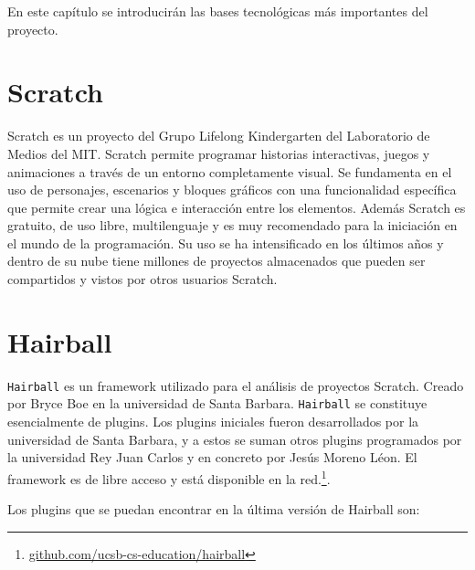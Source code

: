 \documentclass[a4paper, 12pt]{book}
\begin{document}
En este capítulo se introducirán las bases tecnológicas más importantes del proyecto.


\section{Scratch}
\label{sec:seccion2}
Scratch es un proyecto del Grupo Lifelong Kindergarten del Laboratorio de Medios del MIT.
Scratch permite programar historias interactivas, juegos y animaciones a través de un
entorno completamente visual. Se fundamenta en el uso de personajes, escenarios y bloques
gráficos con una funcionalidad específica que permite crear una lógica e interacción
entre los elementos. Además Scratch es gratuito, de uso libre, multilenguaje y es muy
recomendado para la iniciación en el mundo de la programación. Su uso se ha intensificado
en los últimos años y dentro de su nube tiene millones de proyectos almacenados que
pueden ser compartidos y vistos por otros usuarios Scratch.


\section{Hairball}
\label{sec:seccion3}
\texttt{Hairball} es un framework utilizado para el análisis de proyectos Scratch. Creado 
por Bryce Boe en la universidad de Santa Barbara. \texttt{Hairball} se constituye esencialmente de 
plugins. Los plugins iniciales fueron desarrollados por la universidad de Santa Barbara, y
a estos se suman otros plugins programados por la universidad Rey Juan Carlos y en concreto
por Jesús Moreno Léon. El framework es de libre acceso y está disponible en la 
red.\footnote{\url{github.com/ucsb-cs-education/hairball}}.

Los plugins que se puedan encontrar en la última versión de Hairball son:
\end{document}
